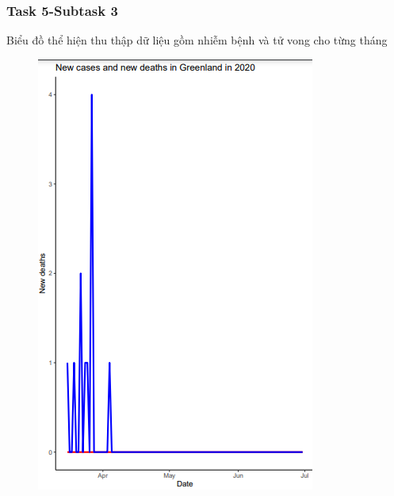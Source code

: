 \documentclass[english,10pt,table]{beamer}
\begin{document}
{
    \frametitle{Task 5-Subtask 3}
    \begin{block}{Biểu đồ thể hiện thu thập dữ liệu gồm nhiễm bệnh và tử vong cho từng tháng}
    \begin{figure}[H]
		\centering
		\includegraphics[scale=0.5]{images/5.3.2.png}
	\end{figure}
    \end{block}
}
\frame
\end{document}
